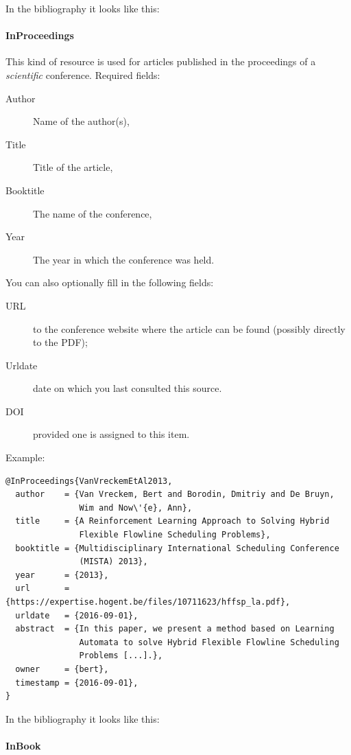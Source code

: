 In the bibliography it looks like this: 

\paragraph{InProceedings}

This kind of resource is used for articles published in the proceedings of a \emph{scientific} conference. Required fields:

\begin{description}
  \item[Author] Name of the author(s),
  \item[Title] Title of the article,
  \item[Booktitle] The name of the conference,
  \item[Year] The year in which the conference was held.
\end{description}

You can also optionally fill in the following fields:

\begin{description}
  \item[URL] to the conference website where the article can be found (possibly directly to the PDF);
  \item[Urldate] date on which you last consulted this source.
  \item[DOI] provided one is assigned to this item.
\end{description}

Example:
\begin{verbatim}
@InProceedings{VanVreckemEtAl2013,
  author    = {Van Vreckem, Bert and Borodin, Dmitriy and De Bruyn,
               Wim and Now\'{e}, Ann},
  title     = {A Reinforcement Learning Approach to Solving Hybrid
               Flexible Flowline Scheduling Problems},
  booktitle = {Multidisciplinary International Scheduling Conference
               (MISTA) 2013},
  year      = {2013},
  url       = {https://expertise.hogent.be/files/10711623/hffsp_la.pdf},
  urldate   = {2016-09-01},
  abstract  = {In this paper, we present a method based on Learning
               Automata to solve Hybrid Flexible Flowline Scheduling 
               Problems [...].},
  owner     = {bert},
  timestamp = {2016-09-01},
}
\end{verbatim}

In the bibliography it looks like this: 

\paragraph{InBook}

